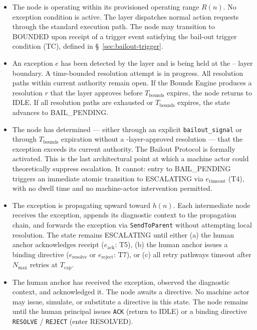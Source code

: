 \begin{itemize}\itemsep=0pt
\item[\textbf{IDLE.}] The node is operating within its provisioned operating range $R(n)$. No exception condition is active. The \fact{} layer dispatches normal action requests through the standard execution path. The node may transition to BOUNDED upon receipt of a trigger event satisfying the bail-out trigger condition (TC), defined in \S~\ref{sec:bailout-trigger}.

\item[\textbf{BOUNDED.}] An exception $e$ has been detected by the \bounds{} layer and is being held at the \bounds{}--\fact{} layer boundary. A time-bounded resolution attempt is in progress. All resolution paths within current authority remain open. If the Bounds Engine produces a resolution $r$ that the \fact{} layer approves before $T_{\text{bounds}}$ expires, the node returns to IDLE. If all resolution paths are exhausted or $T_{\text{bounds}}$ expires, the state advances to BAIL\_PENDING.

\item[\textbf{BAIL\_PENDING.}] The node has determined — either through an explicit \texttt{bailout\_signal} or through $T_{\text{bounds}}$ expiration without a \fact-layer-approved resolution — that the exception exceeds its current authority. The Bailout Protocol is formally activated. This is the last architectural point at which a machine actor could theoretically suppress escalation. It cannot: entry to BAIL\_PENDING triggers an immediate atomic transition to ESCALATING via $e_{\text{timeout}}$ (T4), with no dwell time and no machine-actor intervention permitted.

\item[\textbf{ESCALATING.}] The exception is propagating upward toward $h(n)$. Each intermediate node receives the exception, appends its diagnostic context to the propagation chain, and forwards the exception via \texttt{SendToParent} without attempting local resolution. The state remains ESCALATING until either (a) the human anchor acknowledges receipt ($e_{\text{ack}}$: T5), (b) the human anchor issues a binding directive ($e_{\text{resolve}}$ or $e_{\text{reject}}$: T7), or (c) all retry pathways timeout after $N_{\max}$ retries at $T_{\text{cap}}$.

\item[\textbf{HUMAN\_ACKNOWLEDGED.}] The human anchor has received the exception, observed the diagnostic context, and acknowledged it. The node awaits a directive. No machine actor may issue, simulate, or substitute a directive in this state. The node remains until the human principal issues \texttt{ACK} (return to IDLE) or a binding directive \texttt{RESOLVE} / \texttt{REJECT} (enter RESOLVED).


\end{itemize}
